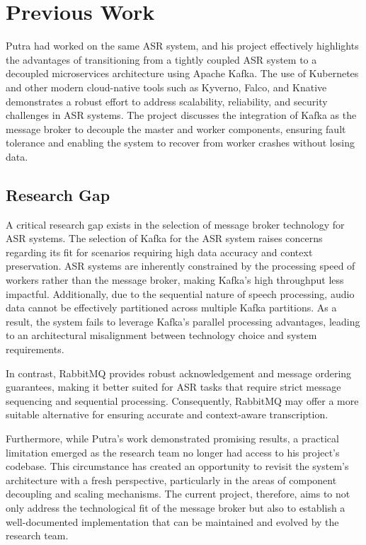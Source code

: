 \section{Previous Work}
Putra \cite{putra} had worked on the same ASR system, and his project effectively highlights the advantages of transitioning from a tightly coupled ASR system to a decoupled microservices architecture using Apache Kafka. The use of Kubernetes and other modern cloud-native tools such as Kyverno, Falco, and Knative demonstrates a robust effort to address scalability, reliability, and security challenges in ASR systems. The project discusses the integration of Kafka as the message broker to decouple the master and worker components, ensuring fault tolerance and enabling the system to recover from worker crashes without losing data.

\subsection{Research Gap}
A critical research gap exists in the selection of message broker technology for ASR systems. The selection of Kafka for the ASR system raises concerns regarding its fit for scenarios requiring high data accuracy and context preservation. ASR systems are inherently constrained by the processing speed of workers rather than the message broker, making Kafka's high throughput less impactful. Additionally, due to the sequential nature of speech processing, audio data cannot be effectively partitioned across multiple Kafka partitions. As a result, the system fails to leverage Kafka's parallel processing advantages, leading to an architectural misalignment between technology choice and system requirements.

In contrast, RabbitMQ provides robust acknowledgement and message ordering guarantees, making it better suited for ASR tasks that require strict message sequencing and sequential processing. Consequently, RabbitMQ may offer a more suitable alternative for ensuring accurate and context-aware transcription.

Furthermore, while Putra's work \cite{putra} demonstrated promising results, a practical limitation emerged as the research team no longer had access to his project's codebase. This circumstance has created an opportunity to revisit the system's architecture with a fresh perspective, particularly in the areas of component decoupling and scaling mechanisms. The current project, therefore, aims to not only address the technological fit of the message broker but also to establish a well-documented implementation that can be maintained and evolved by the research team.

